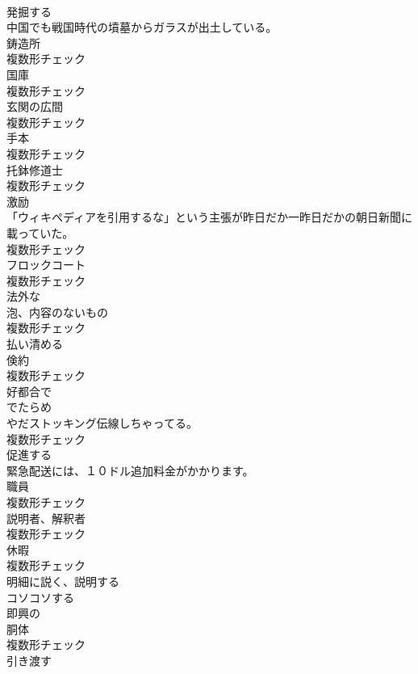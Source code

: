 \documentclass[8pt]{extreport}
\begin{document}
\begin{CJK}{UTF8}{min}
\\	[動詞]	発掘する	
\\	中国でも戦国時代の墳墓からガラスが出土している。	
\\	[名詞]	鋳造所	
\\	複数形チェック
\\	[名詞]	国庫	
\\	複数形チェック
\\	[名詞]	玄関の広間	
\\	複数形チェック
\\	[名詞]	手本	
\\	複数形チェック
\\	[名詞]	托鉢修道士	
\\	複数形チェック
\\	[名詞]	激励	
\\	「ウィキペディアを引用するな」という主張が昨日だか一昨日だかの朝日新聞に載っていた。	
\\	複数形チェック
\\	[名詞]	フロックコート	
\\	複数形チェック
\\	[形容詞]	法外な	
\\	[名詞]	泡、内容のないもの	
\\	複数形チェック
\\	[動詞]	払い清める	
\\	[名詞]	倹約	
\\	複数形チェック
\\	[形容詞]	好都合で	
\\	[名詞]	でたらめ	
\\	やだストッキング伝線しちゃってる。	
\\	複数形チェック
\\	[動詞]	促進する	
\\	緊急配送には、１０ドル追加料金がかかります。	
\\	[名詞]	職員	
\\	複数形チェック
\\	[名詞]	説明者、解釈者	
\\	複数形チェック
\\	[名詞]	休暇	
\\	複数形チェック
\\	[動詞]	明細に説く、説明する	
\\	[形容詞]	コソコソする	
\\	[形容詞]	即興の	
\\	[名詞]	胴体	
\\	複数形チェック
\\	[動詞]	引き渡す	

\end{CJK}
\end{document}
